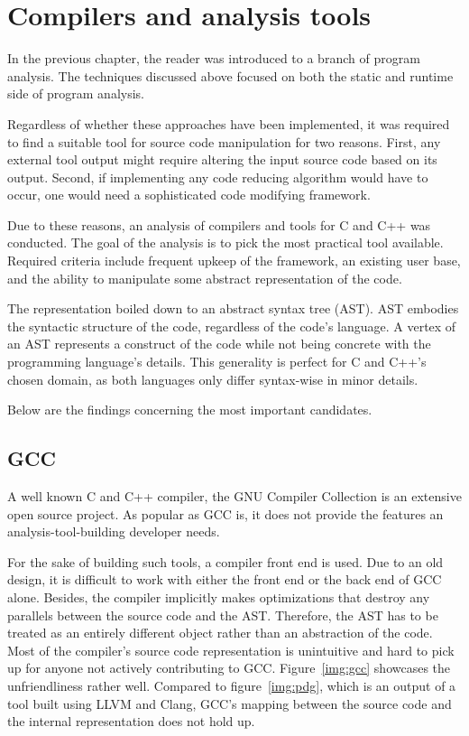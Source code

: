 \chapter{Compilers and analysis tools}


In the previous chapter, the reader was introduced to a branch of program
ana\-ly\-sis. 
The techniques discussed above focused on both the static and runtime
side of program analysis. 

Regardless of whether these approaches have been implemented, it was 
required to find a suitable tool for source code manipulation for two reasons. 
First, any external tool output might require altering the input source code 
based on its output. 
Second, if implementing any code reducing algorithm would have to occur, 
one would need a sophisticated code modifying framework. 

Due to these reasons, an analysis of compilers and tools for C and C++ was conducted. 
The goal of the analysis is to pick the most practical tool available. 
Required criteria include frequent upkeep of the framework, 
an existing user base, and the ability to manipulate some abstract 
representation of the code.

The representation boiled down to an abstract syntax tree (AST). 
AST embodies the syntactic structure of the code, regardless of the code's language. 
A vertex of an AST represents a construct of the code while not being concrete 
with the programming language's details. 
This generality is perfect for C and C++'s chosen domain, 
as both languages only differ syntax-wise in minor details.


Below are the findings concerning the most important candidates.

\section{GCC}

A well known C and C++ compiler, the GNU Compiler Collection is an extensive
open source project. 
As popular as GCC is, it does not provide the features an analysis-tool-building 
developer needs. 

For the sake of building such tools, a compiler front end is used. 
Due to an old design, it is difficult to work with either the front end or 
the back end of GCC alone. 
Besides, the compiler implicitly makes optimizations that destroy any parallels 
between the source code and the AST. 
Therefore, the AST has to be treated as an entirely different object rather than 
an abstraction of the code. 
Most of the compiler's source code representation is unintuitive and 
hard to pick up for anyone not actively contributing to GCC. 
Figure~\ref{img:gcc} showcases the unfriendliness rather well.
Compared to figure~\ref{img:pdg}, which is an output of a tool built using
LLVM and Clang, GCC's mapping between the source code and the internal
representation does not hold up.


